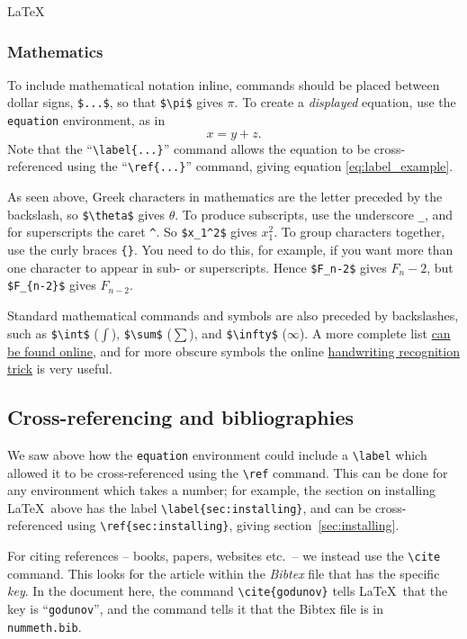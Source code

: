 \begin{chapter}{\LaTeX}
\subsubsection{Mathematics}

To include mathematical notation inline, commands should be placed between dollar signs, \verb|$...$|, so that \verb|$\pi$| gives $\pi$. To create a \emph{displayed} equation, use the \texttt{equation} environment, as in
%
\begin{equation}
  \label{eq:label_example}
  x = y + z.
\end{equation}
%
Note that the ``\verb|\label{...}|'' command allows the equation to be cross-referenced using the ``\verb|\ref{...}|'' command, giving equation \ref{eq:label_example}.

As seen above, Greek characters in mathematics are the letter preceded by the backslash, so \verb|$\theta$| gives $\theta$. To produce subscripts, use the underscore \verb|_|, and for superscripts the caret \verb|^|. So \verb|$x_1^2$| gives $x_1^2$. To group characters together, use the curly braces \verb|{}|. You need to do this, for example, if you want more than one character to appear in sub- or superscripts. Hence \verb|$F_n-2$| gives $F_n-2$, but \verb|$F_{n-2}$| gives $F_{n-2}$.

Standard mathematical commands and symbols are also preceded by backslashes, such as \verb|$\int$| ($\int$), \verb|$\sum$| ($\sum$), and \verb|$\infty$| ($\infty$). A more complete list \href{https://en.wikibooks.org/wiki/LaTeX/Mathematics}{can be found online}, and for more obscure symbols the online \href{http://detexify.kirelabs.org/classify.html}{handwriting recognition trick} is very useful.

\subsection{Cross-referencing and bibliographies}

We saw above how the \texttt{equation} environment could include a \verb|\label| which allowed it to be cross-referenced using the \verb|\ref| command. This can be done for any environment which takes a number; for example, the section on installing \LaTeX\ above has the label \verb|\label{sec:installing}|, and can be cross-referenced using \verb|\ref{sec:installing}|, giving section~\ref{sec:installing}.

For citing references -- books, papers, websites etc.\ -- we instead use the \verb|\cite| command. This looks for the article within the \emph{Bibtex} file that has the specific \emph{key}. In the document here, the command \verb|\cite{godunov}| tells \LaTeX\ that the key is ``\verb|godunov|'', and the command \verb|| tells it that the Bibtex file is in \texttt{nummeth.bib}.


\end{chapter}
